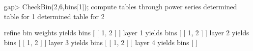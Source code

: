 gap> CheckBin(2,6,bins[1]);
compute tables through power series 
  determined table for 1
  determined table for 2

refine bin 
  weights yields bins [ [ 1, 2 ] ]
  layer 1 yields bins [ [ 1, 2 ] ]
  layer 2 yields bins [ [ 1, 2 ] ]
  layer 3 yields bins [ [ 1, 2 ] ]
  layer 4 yields bins [  ]
\endexample

